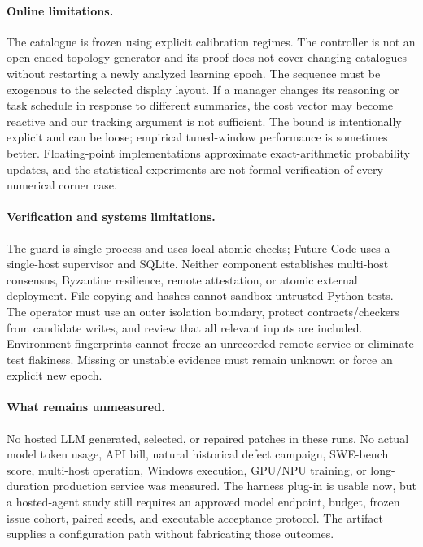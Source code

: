 \paragraph{Online limitations.}
The catalogue is frozen using explicit calibration regimes. The controller is not an open-ended topology generator and its proof does not cover changing catalogues without restarting a newly analyzed learning epoch. The sequence must be exogenous to the selected display layout. If a manager changes its reasoning or task schedule in response to different summaries, the cost vector may become reactive and our tracking argument is not sufficient. The bound is intentionally explicit and can be loose; empirical tuned-window performance is sometimes better. Floating-point implementations approximate exact-arithmetic probability updates, and the statistical experiments are not formal verification of every numerical corner case.

\paragraph{Verification and systems limitations.}
The guard is single-process and uses local atomic checks; Future Code uses a single-host supervisor and SQLite. Neither component establishes multi-host consensus, Byzantine resilience, remote attestation, or atomic external deployment. File copying and hashes cannot sandbox untrusted Python tests. The operator must use an outer isolation boundary, protect contracts/checkers from candidate writes, and review that all relevant inputs are included. Environment fingerprints cannot freeze an unrecorded remote service or eliminate test flakiness. Missing or unstable evidence must remain unknown or force an explicit new epoch.

\paragraph{What remains unmeasured.}
No hosted LLM generated, selected, or repaired patches in these runs. No actual model token usage, API bill, natural historical defect campaign, SWE-bench score, multi-host operation, Windows execution, GPU/NPU training, or long-duration production service was measured. The harness plug-in is usable now, but a hosted-agent study still requires an approved model endpoint, budget, frozen issue cohort, paired seeds, and executable acceptance protocol. The artifact supplies a configuration path without fabricating those outcomes.

